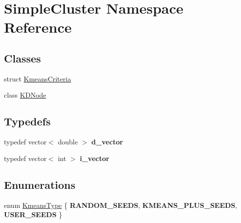 \hypertarget{namespaceSimpleCluster}{\section{Simple\-Cluster Namespace Reference}
\label{namespaceSimpleCluster}
}
\subsection*{Classes}
\begin{DoxyCompactItemize}
\item 
struct \hyperlink{structSimpleCluster_1_1KmeansCriteria}{Kmeans\-Criteria}
\item 
class \hyperlink{classSimpleCluster_1_1KDNode}{K\-D\-Node}
\end{DoxyCompactItemize}
\subsection*{Typedefs}
\begin{DoxyCompactItemize}
\item 
\hypertarget{namespaceSimpleCluster_a2c39f662ef8ab290b2a0613dbc3b4c4e}{typedef vector$<$ double $>$ {\bfseries d\-\_\-vector}}\label{namespaceSimpleCluster_a2c39f662ef8ab290b2a0613dbc3b4c4e}

\item 
\hypertarget{namespaceSimpleCluster_ab17abba17860f283d1defd90861cb798}{typedef vector$<$ int $>$ {\bfseries i\-\_\-vector}}\label{namespaceSimpleCluster_ab17abba17860f283d1defd90861cb798}

\end{DoxyCompactItemize}
\subsection*{Enumerations}
\begin{DoxyCompactItemize}
\item 
enum \hyperlink{namespaceSimpleCluster_a8a8f57121b69a7b43575e4d6a53928e2}{Kmeans\-Type} \{ {\bfseries R\-A\-N\-D\-O\-M\-\_\-\-S\-E\-E\-D\-S}, 
{\bfseries K\-M\-E\-A\-N\-S\-\_\-\-P\-L\-U\-S\-\_\-\-S\-E\-E\-D\-S}, 
{\bfseries U\-S\-E\-R\-\_\-\-S\-E\-E\-D\-S}
 \}
\end{DoxyCompactItemize}
